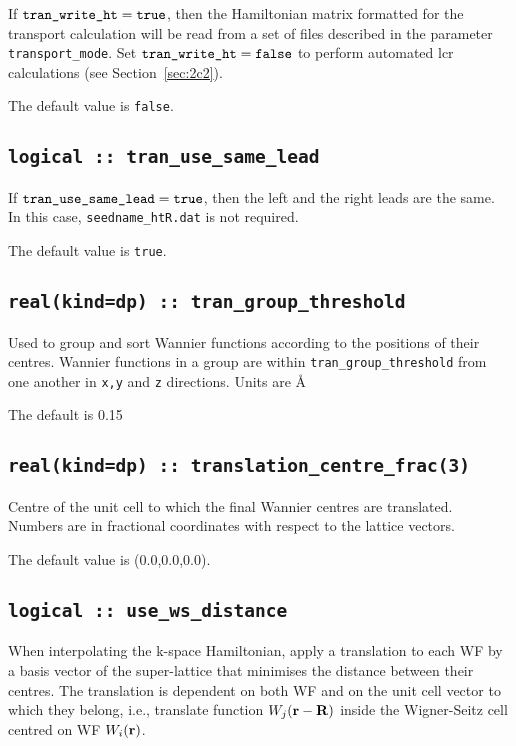 If $\verb#tran_write_ht#=\verb#true#$, then the Hamiltonian matrix
formatted for the transport calculation will be read
from a set of files described in the
parameter \verb#transport_mode#. 
Set $\verb#tran_write_ht#=\verb#false#$ to perform automated 
lcr calculations (see Section~\ref{sec:2c2}).

The default value is {\tt false}.

\subsection[tran\_use\_same\_lead]{\tt logical :: tran\_use\_same\_lead}

If $\verb#tran_use_same_lead#=\verb#true#$, then the
left and the right leads are the same. In this case, 
\verb#seedname_htR.dat# is not required.

The default value is {\tt true}.

\subsection[tran\_group\_threshold]{\tt real(kind=dp) :: tran\_group\_threshold}

Used to group and sort Wannier functions according to the positions of their centres.
Wannier functions in a group are within \verb#tran_group_threshold#
from one another in \verb#x,y# and \verb#z# directions. Units are \AA

The default is 0.15

\subsection[translation\_centre\_frac]{\tt real(kind=dp) :: translation\_centre\_frac(3)}

Centre of the unit cell to which the final Wannier centres are
translated. Numbers are in fractional coordinates with respect to the
lattice vectors.
 
The default value is (0.0,0.0,0.0).

\subsection[use\_ws\_distance]{\tt logical :: use\_ws\_distance}

When interpolating the k-space Hamiltonian, apply a translation to each WF by a basis
vector of the super-lattice that minimises the distance between their centres.
The translation is dependent on both WF and on the unit cell vector
to which they belong, i.e., translate function $W_j({\bf r}-{\bf R})$ inside
the Wigner-Seitz cell centred on WF $W_i({\bf r})$.

